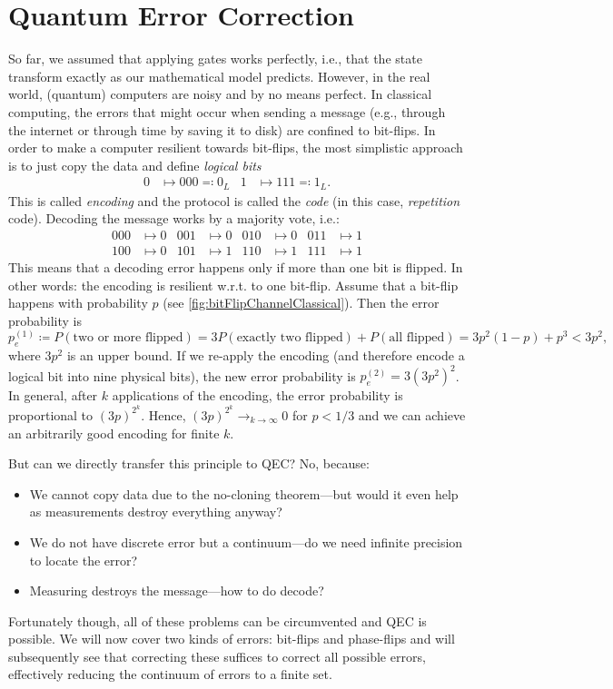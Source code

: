 \chapter{Quantum Error Correction}
	So far, we assumed that applying gates works perfectly, i.e., that the state transform exactly as our mathematical model predicts. However, in the real world, (quantum) computers are noisy and by no means perfect. In classical computing, the errors that might occur when sending a message (e.g., through the internet or through time by saving it to disk) are confined to bit-flips. In order to make a computer resilient towards bit-flips, the most simplistic approach is to just copy the data and define \emph{logical bits}
	\begin{align}
		0 & \mapsto 000 \eqqcolon 0_L  &
		1 & \mapsto 111 \eqqcolon 1_L.
	\end{align}
	This is called \emph{encoding} and the protocol is called the \emph{code} (in this case, \emph{repetition} code). Decoding the message works by a majority vote, i.e.:
	\begin{align}
		000 & \mapsto 0 &
		001 & \mapsto 0 &
		010 & \mapsto 0 &
		011 & \mapsto 1   \\
		100 & \mapsto 0 &
		101 & \mapsto 1 &
		110 & \mapsto 1 &
		111 & \mapsto 1
	\end{align}
	This means that a decoding error happens only if more than one bit is flipped. In other words: the encoding is resilient w.r.t. to one bit-flip. Assume that a bit-flip happens with probability \(p\) (see \autoref{fig:bitFlipChannelClassical}). Then the error probability is
	\begin{equation}
		p_e^{(1)} \coloneqq P(\text{two or more flipped})
		= 3 P(\text{exactly two flipped}) + P(\text{all flipped})
		= 3 p^2 (1 - p) + p^3
		< 3p^2,
	\end{equation}
	where \( 3p^2 \) is an upper bound. If we re-apply the encoding (and therefore encode a logical bit into nine physical bits), the new error probability is \( p_e^{(2)} = 3 (3p^2)^2 \). In general, after \(k\) applications of the encoding, the error probability is proportional to \( (3p)^{2^k} \). Hence, \( (3p)^{2^k} \to_{k \to \infty} 0 \) for \(p < 1/3\) and we can achieve an arbitrarily good encoding for finite \(k\).

	But can we directly transfer this principle to \ac{QEC}? No, because:
	\begin{itemize}
		\item We cannot copy data due to the no-cloning theorem---but would it even help as measurements destroy everything anyway?
		\item We do not have discrete error but a continuum---do we need infinite precision to locate the error?
		\item Measuring destroys the message---how to do decode?
	\end{itemize}
	Fortunately though, all of these problems can be circumvented and \ac{QEC} is possible. We will now cover two kinds of errors: bit-flips and phase-flips and will subsequently see that correcting these suffices to correct all possible errors, effectively reducing the continuum of errors to a finite set.

